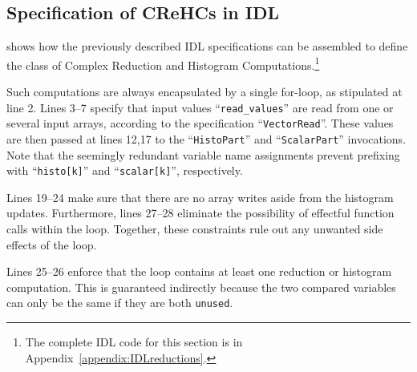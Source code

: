 \subsection{Specification of CReHCs in IDL}
\label{sec:IDLCReHCs}

     shows how the previously described IDL specifications
    can be assembled to define the class of Complex Reduction and Histogram
    Computations.\footnote{The complete IDL code for this section is in
    Appendix~\ref{appendix:IDLreductions}.}

    Such computations are always encapsulated by a single for-loop, as
    stipulated at line 2.
    Lines 3--7 specify that input values ``{\tt read\_values}'' are read from
    one or several input arrays, according to the specification
    ``{\tt VectorRead}''.
    These values are then passed at lines 12,17 to the ``{\tt HistoPart}''
    and ``{\tt ScalarPart}'' invocations.
    Note that the seemingly redundant variable name assignments prevent
    prefixing with ``{\tt histo[k]}'' and ``{\tt scalar[k]}'', respectively.

    Lines 19--24 make sure that there are no array writes aside from the
    histogram updates.
    Furthermore, lines 27--28 eliminate the possibility of effectful function
    calls within the loop.
    Together, these constraints rule out any unwanted side effects of the loop.

    Lines 25--26 enforce that the loop contains at least one reduction or
    histogram computation.
    This is guaranteed indirectly because the two compared variables can only be
    the same if they are both {\tt unused}.

